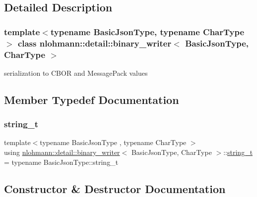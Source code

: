 \subsection{Detailed Description}
\subsubsection*{template$<$typename Basic\+Json\+Type, typename Char\+Type$>$\newline
class nlohmann\+::detail\+::binary\+\_\+writer$<$ Basic\+Json\+Type, Char\+Type $>$}

serialization to C\+B\+OR and Message\+Pack values 

\subsection{Member Typedef Documentation}
\mbox{\label{classnlohmann_1_1detail_1_1binary__writer_a29f2ae7a5c4a8c1dae47b3b2310de8a8}} 
\subsubsection{\texorpdfstring{string\+\_\+t}{string\_t}}
{\footnotesize\ttfamily template$<$typename Basic\+Json\+Type , typename Char\+Type $>$ \\
using \hyperlink{classnlohmann_1_1detail_1_1binary__writer}{nlohmann\+::detail\+::binary\+\_\+writer}$<$ Basic\+Json\+Type, Char\+Type $>$\+::\hyperlink{classnlohmann_1_1detail_1_1binary__writer_a29f2ae7a5c4a8c1dae47b3b2310de8a8}{string\+\_\+t} =  typename Basic\+Json\+Type\+::string\+\_\+t\hspace{0.3cm}{\ttfamily [private]}}



\subsection{Constructor \& Destructor Documentation}
\mbox{\label{classnlohmann_1_1detail_1_1binary__writer_a373289af95a946c19bb4a58a5df71a78}} 
